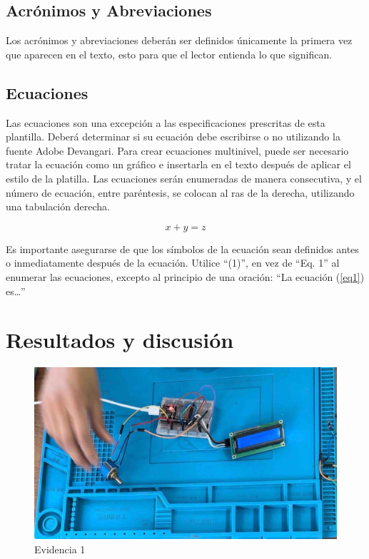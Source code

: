     \subsection{Acrónimos y Abreviaciones}
    
    Los acrónimos y abreviaciones deberán ser definidos únicamente la primera vez que aparecen en el texto, esto para que el lector entienda lo que significan.
    
    \subsection{Ecuaciones}
    
    Las ecuaciones son una excepción a las especificaciones prescritas de esta plantilla. 
    Deberá determinar si su ecuación debe escribirse o no utilizando la fuente Adobe Devangari. 
    Para crear ecuaciones multinivel, puede ser necesario tratar la ecuación como un gráfico e insertarla en el texto después de aplicar el estilo de la platilla.
    Las ecuaciones serán enumeradas de manera consecutiva, y el número de ecuación, entre paréntesis, se colocan al ras de la derecha, utilizando una tabulación derecha. 
    
    \begin{equation}
        \label{eq1}
        x + y = z 
    \end{equation}
    
    Es importante asegurarse de que los símbolos de la ecuación sean definidos antes o inmediatamente después de la ecuación. Utilice “(1)”, en vez de “Eq. 1” al enumerar las ecuaciones, excepto al principio de una oración: “La ecuación (\ref{eq1}) es…”
    
    \section{Resultados y discusión}
    
    \begin{figure}[H]
        \centering
        \includegraphics[trim = {0mm 0mm 0mm 0mm},clip,scale=0.2]{8/Img/Evidencia 1.pdf}
        \caption{Evidencia 1}
        \label{Evidencia 1}
    \end{figure}
    

